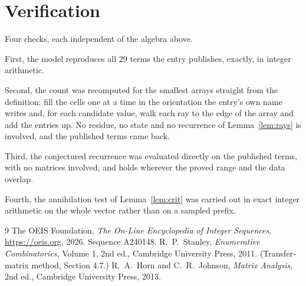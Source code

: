 \documentclass[11pt,a4paper]{article}
\theoremstyle{plain}
\theoremstyle{definition}
\begin{document}
\section{Verification}

Four checks, each independent of the algebra above.

First, the model reproduces all $29$ terms the entry publishes, exactly, in integer
arithmetic.

Second, the count was recomputed for the smallest arrays straight from the definition: fill the
cells one at a time in the orientation the entry's own name writes and, for each candidate
value, walk each ray to the edge of the array and add the entries up. No residue, no state and
no recurrence of Lemma~\ref{lem:rays} is involved, and the published terms came back.

Third, the conjectured recurrence was evaluated directly on the published terms, with no
matrices involved, and holds wherever the proved range and the data overlap.

Fourth, the annihilation test of Lemma~\ref{lem:crit} was carried out in exact integer
arithmetic on the whole vector rather than on a sampled prefix.

\begin{thebibliography}{9}
 The OEIS Foundation, \emph{The On-Line Encyclopedia of Integer
Sequences}, \url{https://oeis.org}, 2026. Sequence A240148.
 R.~P.~Stanley, \emph{Enumerative Combinatorics}, Volume 1, 2nd ed.,
Cambridge University Press, 2011. (Transfer-matrix method, Section 4.7.)
 R.~A.~Horn and C.~R.~Johnson, \emph{Matrix Analysis}, 2nd ed., Cambridge
University Press, 2013.
\end{thebibliography}
\end{document}
